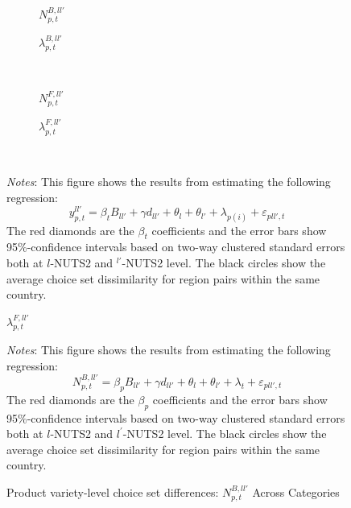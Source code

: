 \begin{figure}[H]
    \centering
    \caption{Choice set differences: Across Years}
    \label{fig: app_redform_choice_years}
        \begin{subfigure}[t]{.49\textwidth}
            \centering
            \caption{$N^{B,ll'}_{p,t}$}
            \scalebox{0.45}{}
        \end{subfigure}
        \begin{subfigure}[t]{.49\textwidth}
            \centering
            \caption{$\lambda^{B,ll'}_{p,t}$}
            \scalebox{0.45}{}
        \end{subfigure}\\
        \begin{subfigure}[t]{.49\textwidth}
            \centering
            \caption{$ N^{F,ll'}_{p,t}$}
            \scalebox{0.45}{}
        \end{subfigure}
        \begin{subfigure}[t]{.49\textwidth}
            \centering
            \caption{$\lambda^{F,ll'}_{p,t}$}
            \scalebox{0.45}{}
        \end{subfigure}\\
     \parbox{\textwidth}{
        \begin{spacing}{1} 
            {\footnotesize 
            \textit{Notes}: This figure shows the results from estimating the following regression: $$ y^{ll'}_{p,t} = \beta_t B_{ll'} + \gamma d_{ll'} + \theta_l + \theta_{l'} + \lambda_{p(i)} + \varepsilon_{pll',t}$$The red diamonds are the $\beta_{t}$ coefficients and the error bars show 95\%-confidence intervals based on two-way clustered standard errors both at $l$-NUTS2 and $^{l'}$-NUTS2 level. The black circles show the average choice set dissimilarity for region pairs within the same country.}
        \end{spacing}}
 \end{figure} 

 \begin{figure}[H]
    \centering
    \caption{Product variety-level choice set differences: $N^{B,ll'}_{p,t}$ Across 
    Categories}
    \label{fig: app_redform_choice_bar_cats_n}
    
     \parbox{\textwidth}{
        \begin{spacing}{1} 
            {\footnotesize 
            \textit{Notes}: This figure shows the results from estimating the following regression:$$ N^{B,ll'}_{p,t} = \beta_{p} B_{ll'} + \gamma d_{ll'} + \theta_l + \theta_{l'} + \lambda_{t} + \varepsilon_{pll',t}$$ The red diamonds are the $\beta_{p}$ coefficients and the error bars show 95\%-confidence intervals based on two-way clustered standard errors both at $l$-NUTS2 and $l^{'}$-NUTS2 level. The black circles show the average choice set dissimilarity for region pairs within the same country.}
        \end{spacing}}
 \end{figure} 

